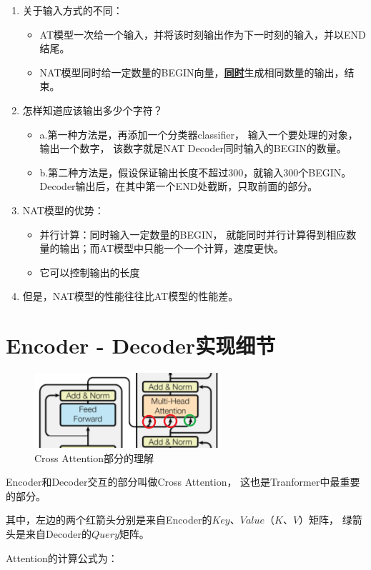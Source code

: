 \documentclass[AutoFakeBold]{MyFormat}
\begin{document}
\begin{enumerate}
    \item 关于输入方式的不同： 
    \begin{itemize}
        \item AT模型一次给一个输入，并将该时刻输出作为下一时刻的输入，并以END结尾。
        \item NAT模型同时给一定数量的BEGIN向量，\textbf{\Large \underline{同时}}生成相同数量的输出，结束。
    \end{itemize}
    \item 怎样知道应该输出多少个字符？
    \begin{itemize}
        \item a.第一种方法是，再添加一个分类器classifier，
        输入一个要处理的对象，输出一个数字，
        该数字就是NAT Decoder同时输入的BEGIN的数量。
        \item b.第二种方法是，假设保证输出长度不超过300，就输入300个BEGIN。
        Decoder输出后，在其中第一个END处截断，只取前面的部分。
    \end{itemize}
    \item NAT模型的优势：
    \begin{itemize}
        \item 并行计算：同时输入一定数量的BEGIN，
        就能同时并行计算得到相应数量的输出；而AT模型中只能一个一个计算，速度更快。
        \item 它可以控制输出的长度
    \end{itemize}
    \item 但是，NAT模型的性能往往比AT模型的性能差。
\end{enumerate}

\section{Encoder - Decoder实现细节}

\begin{figure}[!h]
    \centering
    \includegraphics[width=0.5\linewidth]{figures/2022.05.24/pic7.png}
    \caption{Cross Attention部分的理解}
\end{figure}

\par Encoder和Decoder交互的部分叫做Cross Attention，
这也是Tranformer中最重要的部分。
\par 其中，左边的两个红箭头分别是来自Encoder的$Key$、$Value$（$K$、$V$）矩阵，
绿箭头是来自Decoder的$Query$矩阵。
\par Attention的计算公式为：
\end{document}
